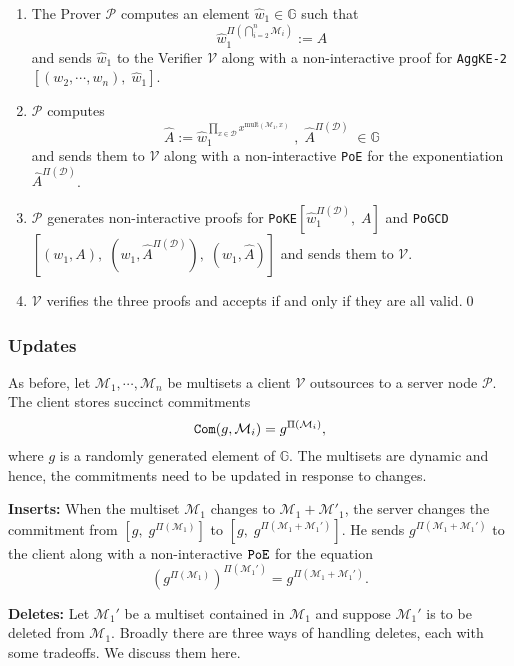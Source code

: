 \documentclass[11pt, lettersize, notitlepage, leqno, footskip=0.6cm]{article}
\newcommand{\pl}{\prod\limits}
\newcommand{\ttt}{\texttt}
\newcommand{\bG}{\mathbb{G}}
\newcommand{\pr}{\protect}
\newcommand{\mc}{\mathcal}
\newcommand{\mb}{\mathbb}
\newcommand{\mr}{\mathrm}
\newcommand{\what}{\widehat}
\newcommand{\mP}{\mc{P}}
\newcommand{\V}{\mc{V}}
\newcommand{\vs}{\vspace{-0.15cm}}
\newcommand{\noin}{\noindent}
\newcommand{\nons}{non-interactive proofs}
\numberwithin{equation}{section}
\begin{document}
\begin{enumerate}[wide, labelwidth=!, labelindent=0pt] \vs

\item The Prover $\mP$ computes an element $\what{w}_1\in\mb{G}$ such that \vs $$\what{w}_1^{\Pi(\bigcap\limits_{i=2}^n \mc{M}_i)}:= A$$ and sends $\what{w}_1$ to the Verifier $\V$ along with a non-interactive proof for \verb|AggKE-2|$[(w_2,\cdots,w_n),\;\what{w}_1]$. \vspace{-0.5cm}

\item $\mP$ computes \vs $$\what{A}:= \what{w}_1^{\pl_{x\in\mc{D}}x^{\mr{mult}(\mc{M}_1,x)}}\;,\;\what{A}^{\Pi(\mc{D})}\;\in\mb{G}$$ and sends them to $\V$ along with a non-interactive \verb|PoE| for the exponentiation $\what{A}^{\Pi(\mc{D})}$. \vs

\item $\mP$ generates \nons\; for \verb|PoKE|$[\what{w}_1^{\Pi(\mc{D})},\;A]$ and \verb|PoGCD|$[(w_1,A),\;(w_1, \what{A}^{\Pi(\mc{D})}),\;(w_1, \what{A})]$ and sends them to $\V$. \vs

\item $\V$ verifies the three proofs and accepts if and only if they are all valid.\qed\end{enumerate}


\subsubsection{\fontsize{11}{11} Updates}

As before, let $\mc{M}_1,\cdots, \mc{M}_n$ be multisets a client $\V$ outsources to a server node $\mP$. The client stores succinct commitments \vs $$\pr{\ttt{Com}}(g, \mc{M}_i) = g^{\Pi(\mc{M}_i)},$$ where $g$ is a randomly generated element of $\bG$. The multisets are dynamic and hence, the commitments need to be updated in response to changes. \vspace{0.15cm}

\noin \textbf{Inserts:} When the multiset $\mc{M}_1$ changes to $\mc{M}_1+\mc{M}'_1$, the server changes the commitment from $[g,\; g^{\Pi(\mc{M}_1)}]$ to $[g,\;g^{\Pi(\mc{M}_1+\mc{M}_1')}]$. He sends $g^{\Pi(\mc{M}_1+\mc{M}_1')}$ to the client along with a non-interactive $\tt{PoE}$ for the equation \vs $$(g^{\Pi(\mc{M}_1)})^{\Pi(\mc{M}_1')} =   g^{\Pi(\mc{M}_1+\mc{M}_1')}.$$  

\noin \textbf{Deletes:} Let $\mc{M}_1'$ be a multiset contained in $\mc{M}_1$ and suppose $\mc{M}_1'$ is to be deleted from $\mc{M}_1$. Broadly there are three ways of handling deletes, each with some tradeoffs. We discuss them here. \vspace{0.1cm}
\end{document}
